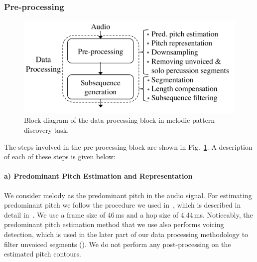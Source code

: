 \subsubsection{Pre-processing}
\label{sec:pattern_discover_preprocessing}

\begin{figure}
	\begin{center}
		\includegraphics[width=\figSizeEightyFive]{ch06_patterns/figures/discovery/blockDiagram_DataProc.pdf}
	\end{center}
	\caption[Block diagram of data processing modules for melodic pattern discovery]{Block diagram of the data processing block in melodic pattern discovery task.}
	\label{fig:pattern_discovery_preprocessing_block_diagram}
\end{figure}


The steps involved in the pre-processing block are shown in Fig.~\ref{fig:pattern_discovery_preprocessing_block_diagram}. A description of each of these steps is given below:

\paragraph{a) Predominant Pitch Estimation and Representation} 

We consider melody as the predominant pitch in the audio signal. For estimating predominant pitch we follow the procedure we used in~, which is described in detail in~. We use a frame size of 46\,ms and a hop size of 4.44\,ms. Noticeably, the predominant pitch estimation method that we use also performs voicing detection, which is used in the later part of our data processing methodology to filter unvoiced segments (). We do not perform any post-processing on the estimated pitch contours.

